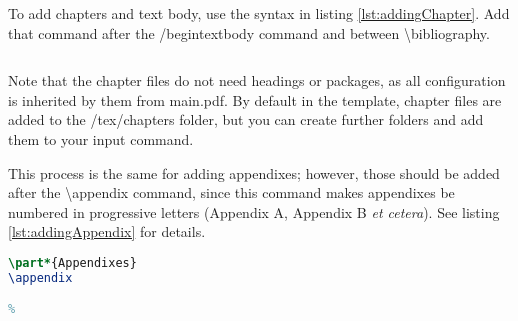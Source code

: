 	To add chapters and text body, use the syntax in listing \ref{lst:addingChapter}. Add that command after the {\ttfamily\small /begintextbody} command and between {\ttfamily\small \textbackslash bibliography}.

\begin{lstlisting}[caption = {Adding a chapter to text body}, label = {lst:addingChapter}, style = prettyListing, language = tex]
%

\end{lstlisting}

	Note that the chapter files do not need headings or packages, as all configuration is inherited by them from {\texttt\small main.pdf}. By default in the template, chapter files are added to the {\ttfamily\small /tex/chapters} folder, but you can create further folders and add them to your {\ttfamily\small input} command.

	This process is the same for adding appendixes; however, those should be added after the {\ttfamily\small \textbackslash appendix} command, since this command makes appendixes be numbered in progressive letters (Appendix A, Appendix B \textit{et cetera}). See listing \ref{lst:addingAppendix} for details.

\begin{lstlisting}[caption = {Adding an appendix to text body}, label = {lst:addingAppendix}, style = prettyListing, language = tex]
\part*{Appendixes}
\appendix

%


\end{lstlisting}
